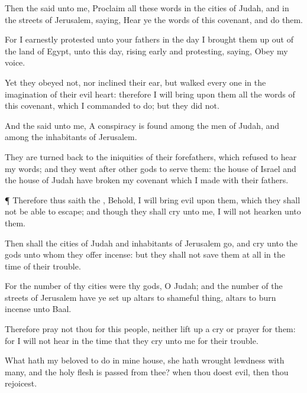 {Then the
{}
said unto me,
Proclaim all these
words in the
cities of
Judah, and in the
streets of
Jerusalem,
saying,
Hear ye the
words of this
covenant, and
do them.

For I
earnestly
protested unto your
fathers in the
day
{} I brought them
up out of the
land of
Egypt,
{} unto this
day, rising
early and
protesting,
saying,
Obey my
voice.

Yet they
obeyed not, nor
inclined their
ear, but
walked every
one in the
imagination of their
evil
heart: therefore I will
bring upon them all the
words of this
covenant, which I
commanded
{} to
do; but they
did
{} not.

And the
{}
said unto me, A
conspiracy is
found among the
men of
Judah, and among the
inhabitants of
Jerusalem.

They are turned
back to the
iniquities of their
forefathers, which
refused to
hear my
words; and they
went
after
other
gods to
serve them: the
house of
Israel and the
house of
Judah have
broken my
covenant which I
made with their
fathers.


\par }{\PP {}¶ Therefore thus
saith the
{}, Behold, I will
bring
evil upon them, which they shall not be
able to
escape; and though they shall
cry unto me, I will not
hearken unto them.

Then shall the
cities of
Judah and
inhabitants of
Jerusalem
go, and
cry unto the
gods unto whom they offer
incense: but they shall not
save them at
all in the
time of their
trouble.

For
{} the
number of thy
cities were thy
gods, O
Judah; and
{} the
number of the
streets of
Jerusalem have ye set
up
altars to
{} shameful
thing,
{}
altars to burn
incense unto
Baal.

Therefore
pray not thou for this
people, neither lift
up a
cry or
prayer for them: for I will not
hear
{} in the
time that they
cry unto me for their
trouble.

What hath my
beloved to do in mine
house,
{} she hath
wrought
lewdness with
many, and the
holy
flesh is
passed from thee? when thou doest
evil, then thou
rejoicest.

}
